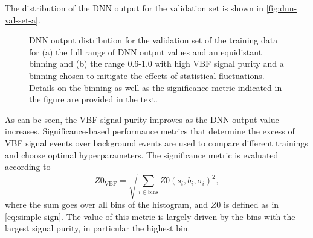The distribution of the DNN output for the validation set is shown in \cref{fig:dnn-val-set-a}.
\begin{figure}[ht]
    \caption{DNN output distribution for the validation set of the training data for (a) the full range of DNN output values and an equidistant binning and (b) the range 0.6-1.0 with high VBF signal purity and a binning chosen to mitigate the effects of statistical fluctuations. Details on the binning as well as the significance metric indicated in the figure are provided in the text.}
    \label{fig:dnn-val-set}
\end{figure}
As can be seen, the VBF signal purity improves as the DNN output value increases.
Significance-based performance metrics that determine the excess of VBF signal events over background events are used to compare different trainings and choose optimal hyperparameters.
The significance metric is evaluated according to
\begin{equation}
    \label{eq:significance-performance-metric}
    Z0_{\mathrm{VBF}} = \sqrt{ \sum_{i \in \text{bins}} Z0(s_{i}, b_{i}, \sigma_{i})^2 },
\end{equation}
where the sum goes over all bins of the histogram, and $Z0$ is defined as in \cref{eq:simple-sign}.
The value of this metric is largely driven by the bins with the largest signal purity, in particular the highest bin.

